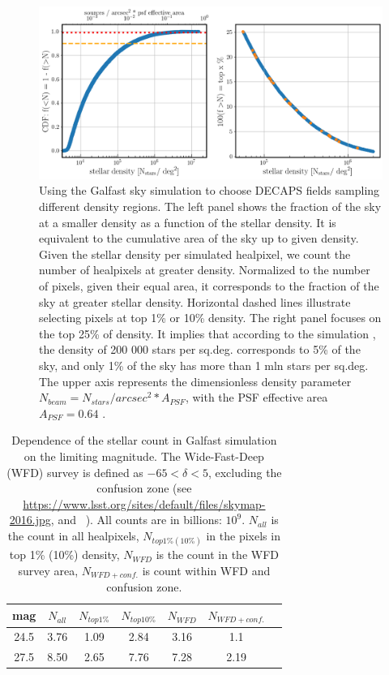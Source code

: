 \documentclass[DM,lsstdraft,toc,usenatbib,authoryear]{lsstdoc}
\begin{document}
\begin{figure}
\centering
\includegraphics[width=0.95\columnwidth]{figs/MAF_density_definitions.png}
\vskip -0.15in
\caption{Using the Galfast sky simulation to choose DECAPS fields sampling different density regions.  The left panel shows the fraction of the sky at a smaller density  as a function of  the stellar density.  It is equivalent to the cumulative area of the sky up to given density. Given the stellar density per simulated healpixel, we count the number of healpixels at greater density. Normalized to the number of pixels, given their equal area, it corresponds to the fraction of the sky at greater stellar density. Horizontal dashed lines illustrate selecting pixels at top 1\% or 10\% density. The right panel focuses on the top 25\% of density.  It implies that according to the simulation , the density of 200 000 stars per sq.deg. corresponds to 5\% of the sky, and only  1\% of the sky has more than 1 mln stars per sq.deg. The upper axis represents the dimensionless density parameter $N_{beam} = N_{stars}/{arcsec}^{2} * A_{PSF}$, with the PSF effective area $A_{PSF} = 0.64$ \arcsec.}
\label{fig:illustrate_density}
\end{figure}

\begin{table}
\centering
\caption{Dependence of the stellar count in Galfast simulation  on the limiting magnitude. The Wide-Fast-Deep (WFD) survey is defined as $-65 < \delta < 5$, excluding the confusion zone (see \url{https://www.lsst.org/sites/default/files/skymap-2016.jpg}, and ~\cite{awan2016}). All counts are in billions:  $10^{9}$. $N_{all}$ is the count in all healpixels, $N_{top 1\% (10\%)}$ in the pixels in top 1\% (10\%) density, $N_{WFD}$ is the count in the WFD survey area,  $N_{WFD+conf.}$ is count within WFD and confusion zone. }
\label{tab:galfast_counts}
\begin{tabular}{ ccccccc}
\hline
mag & $N_{all}$ &  $N_{top 1\%}$ & $N_{top 10\%}$ & $N_{WFD}$ & $N_{WFD+conf.}$ \\
\hline
24.5  & 3.76    & 1.09  &  2.84 &  3.16 & 1.1  \\
27.5  & 8.50    & 2.65  &  7.76 &  7.28 & 2.19 \\
\hline
\end{tabular}
\end{table}
\end{document}
